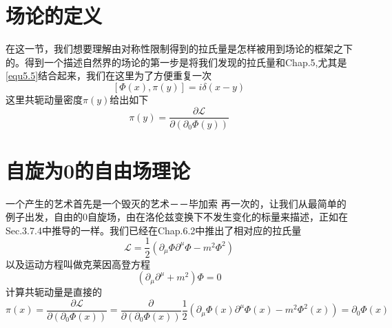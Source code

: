 \section{场论的定义}
在这一节，我们想要理解由对称性限制得到的拉氏量是怎样被用到场论的框架之下的。得到一个描述自然界的场论的第一步是将我们发现的拉氏量和Chap.5,尤其是\ref{equ5.5}结合起来，我们在这里为了方便重复一次
\begin{equation} \label{equ9.1}
[\Phi(x),\pi(y)]=i\delta(x-y)
\end{equation}
这里共轭动量密度$\pi(y)$给出如下
\begin{equation} \label{equ9.2}
\pi(y)=\frac{\partial \mathcal{L}}{\partial(\partial_{0}\Phi(y))}
\end{equation}
\section{自旋为0的自由场理论}
一个产生的艺术首先是一个毁灭的艺术－－毕加索
再一次的，让我们从最简单的例子出发，自由的0自旋场，由在洛伦兹变换下不发生变化的标量来描述，正如在Sec.3.7.4中推导的一样。我们已经在Chap.6.2中推出了相对应的拉氏量
\begin{equation} \label{equ9.3}
\mathcal{L}=\frac{1}{2}(\partial_{\mu}\Phi \partial^{\mu}\Phi-m^{2}\Phi^{2})
\end{equation}
以及运动方程叫做克莱因高登方程
\begin{equation} \label{equ9.4}
(\partial_{\mu}\partial^{\mu}+m^{2})\Phi=0
\end{equation}
计算共轭动量是直接的
$$\pi(x)=\frac{\partial \mathcal{L}}{\partial( \partial_{0}\Phi(x))}=\frac{\partial}{\partial(\partial_{0}\Phi(x))} \frac{1}{2}(\partial_{\mu}\Phi(x)\partial^{\mu}\Phi(x)-m^{2}\Phi^{2}(x))=\partial_{0}\Phi(x)$$

